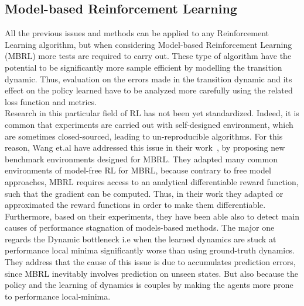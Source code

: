 \documentclass{article}
\begin{document}
\subsection{Model-based Reinforcement Learning}
All the previous issues and methods can be applied to any Reinforcement Learning algorithm, but when considering Model-based Reinforcement Learning (MBRL) more tests are required to carry out. These type of algorithm have the potential to be significantly more sample efficient by modelling the transition dynamic. Thus, evaluation on the errors made in the transition dynamic and its effect on the policy learned have to be analyzed more carefully using the related loss function and metrics.\\
Research in this particular field of RL has not been yet standardized. Indeed, it is common that experiments are carried out with self-designed environment, which are sometimes closed-sourced, leading to un-reproducible algorithms. For this reason,  Wang et.al have addressed this issue in their work~\cite{MBRLBenchmarking}, by proposing new benchmark environments designed for MBRL. They adapted many common environments of model-free RL for MBRL, because contrary to free model approaches, MBRL requires access to an analytical differentiable reward function, such that the gradient can be computed. Thus, in their work they adapted or approximated the reward functions in order to make them differentiable.\\ Furthermore, based on their experiments, they have been able also to detect main causes of performance stagnation of models-based methods. The major one regards the Dynamic bottleneck i.e when the learned dynamics are stuck at performance local minima significantly worse than using ground-truth dynamics. They address that the cause of this issue is due to accumulates prediction errors, since MBRL inevitably involves prediction on unseen states. But also because the policy and the learning of dynamics is couples by making the agents more prone to performance local-minima.
\end{document}
